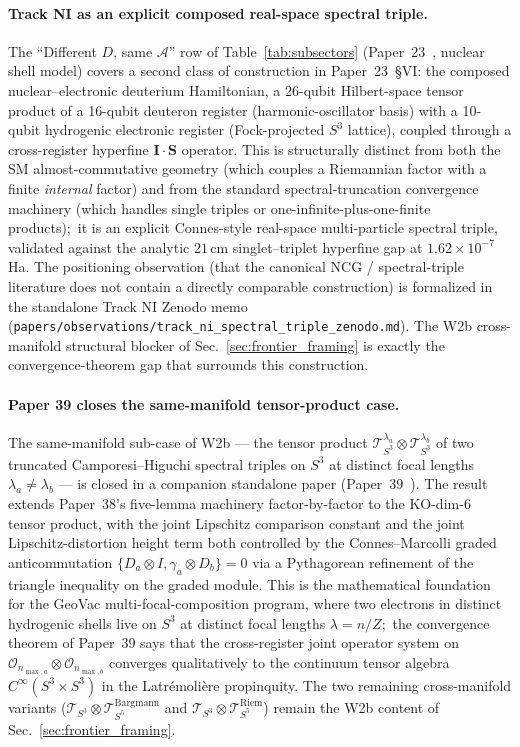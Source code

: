 \documentclass[11pt]{article}
\providecommand{\Tcal}{\mathcal{T}}
\providecommand{\Op}{\mathcal{O}}
\providecommand{\sthree}{S^3}
\providecommand{\nmaxa}{n_{\max, a}}
\providecommand{\nmaxb}{n_{\max, b}}
\begin{document}
\paragraph{Track NI as an explicit composed real-space spectral triple.}
The ``Different $D$, same $\mathcal{A}$'' row of
Table~\ref{tab:subsectors} (Paper~23~\cite{paper23}, nuclear shell
model) covers a second class of construction in Paper~23~\S VI: the
composed nuclear--electronic deuterium Hamiltonian, a 26-qubit
Hilbert-space tensor product of a 16-qubit deuteron register
(harmonic-oscillator basis) with a 10-qubit hydrogenic electronic
register (Fock-projected $S^3$ lattice), coupled through a
cross-register hyperfine $\mathbf{I}\cdot\mathbf{S}$ operator.  This
is structurally distinct from both the SM almost-commutative geometry
(which couples a Riemannian factor with a finite \emph{internal}
factor) and from the standard spectral-truncation convergence
machinery (which handles single triples or one-infinite-plus-one-finite
products);\ it is an explicit Connes-style real-space multi-particle
spectral triple, validated against the analytic $21\,$cm
singlet--triplet hyperfine gap at $1.62 \times 10^{-7}$ Ha.  The
positioning observation (that the canonical NCG / spectral-triple
literature does not contain a directly comparable construction) is
formalized in the standalone Track NI Zenodo memo
(\texttt{papers/observations/track\_ni\_spectral\_triple\_zenodo.md}).
The W2b cross-manifold structural blocker of
Sec.~\ref{sec:frontier_framing} is exactly the convergence-theorem
gap that surrounds this construction.

\paragraph{Paper 39 closes the same-manifold tensor-product case.}
The same-manifold sub-case of W2b --- the tensor product
$\Tcal_{\sthree}^{\lambda_a} \otimes \Tcal_{\sthree}^{\lambda_b}$ of
two truncated Camporesi--Higuchi spectral triples on $\sthree$ at
distinct focal lengths $\lambda_a \neq \lambda_b$ --- is closed in a
companion standalone paper (Paper~39~\cite{paper39}). The result
extends Paper~38's five-lemma machinery factor-by-factor to the
KO-dim-$6$ tensor product, with the joint Lipschitz comparison
constant and the joint Lipschitz-distortion height term both
controlled by the Connes--Marcolli graded anticommutation
$\{D_a \otimes I, \gamma_a \otimes D_b\} = 0$ via a Pythagorean
refinement of the triangle inequality on the graded module. This is
the mathematical foundation for the GeoVac multi-focal-composition
program, where two electrons in distinct hydrogenic shells live on
$\sthree$ at distinct focal lengths $\lambda = n/Z$;\ the convergence
theorem of Paper~39 says that the cross-register joint
operator system on $\Op_{\nmaxa} \otimes \Op_{\nmaxb}$ converges
qualitatively to the continuum tensor algebra $C^\infty(\sthree
\times \sthree)$ in the Latr\'emoli\`ere propinquity. The two
remaining cross-manifold variants
($\Tcal_{\sthree} \otimes \Tcal_{S^5}^{\mathrm{Bargmann}}$ and
$\Tcal_{\sthree} \otimes \Tcal_{S^5}^{\mathrm{Riem}}$) remain the W2b
content of Sec.~\ref{sec:frontier_framing}.
\end{document}
